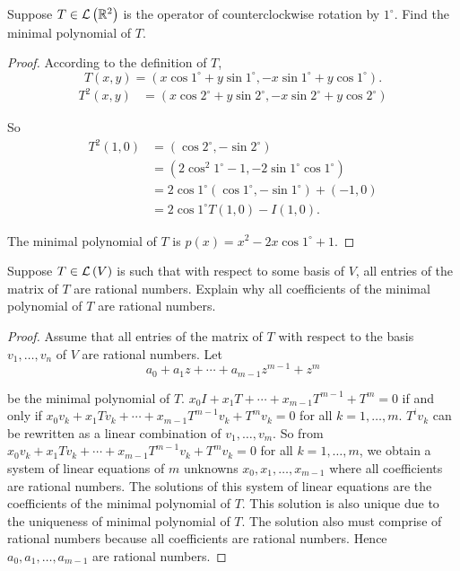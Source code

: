 \begin{exercise}
    Suppose $T\in\mathcal{L}\left({\mathbb{R}^{2}}\right)$ is the operator of counterclockwise rotation by $1^\circ$. Find the minimal polynomial of $T$.
\end{exercise}

\begin{proof}
    According to the definition of $T$,
    \[
        T(x, y) = (x\cos 1^{\circ} + y \sin 1^{\circ}, -x\sin 1^{\circ} + y\cos 1^{\circ}).
    \]
    \begin{align*}
        T^{2}(x, y) & = (x\cos 2^{\circ} + y\sin 2^{\circ}, -x\sin 2^{\circ} + y\cos 2^{\circ})
    \end{align*}

    So
    \begin{align*}
        T^{2}(1, 0) & = (\cos 2^{\circ}, -\sin 2^{\circ})                          \\
                    & = (2\cos^{2} 1^{\circ} - 1, -2\sin 1^{\circ}\cos 1^{\circ})  \\
                    & = 2\cos 1^{\circ}(\cos 1^{\circ}, -\sin 1^{\circ}) + (-1, 0) \\
                    & = 2\cos 1^{\circ} T(1, 0) - I(1, 0).
    \end{align*}

    The minimal polynomial of $T$ is $p(x) = x^{2} - 2x\cos 1^{\circ} + 1$.
\end{proof}
\newpage

\begin{exercise}
    Suppose $T\in\mathcal{L}\left({V}\right)$ is such that with respect to some basis of $V$, all entries of the matrix of $T$ are rational numbers. Explain why all coefficients of the minimal polynomial of $T$ are rational numbers.
\end{exercise}

\begin{proof}
    Assume that all entries of the matrix of $T$ with respect to the basis $v_{1}, \ldots, v_{n}$ of $V$ are rational numbers. Let
    \[
        a_{0} + a_{1}z + \cdots + a_{m-1}z^{m-1} + z^{m}
    \]

    be the minimal polynomial of $T$. $x_{0}I + x_{1}T + \cdots + x_{m-1}T^{m-1} + T^{m} = 0$ if and only if $x_{0}v_{k} + x_{1}Tv_{k} + \cdots + x_{m-1}T^{m-1}v_{k} + T^{m}v_{k} = 0$ for all $k = 1,\ldots, m$. $T^{i}v_{k}$ can be rewritten as a linear combination of $v_{1}, \ldots, v_{m}$. So from  $x_{0}v_{k} + x_{1}Tv_{k} + \cdots + x_{m-1}T^{m-1}v_{k} + T^{m}v_{k} = 0$ for all $k = 1,\ldots, m$, we obtain a system of linear equations of $m$ unknowns $x_{0}, x_{1}, \ldots, x_{m-1}$ where all coefficients are rational numbers. The solutions of this system of linear equations are the coefficients of the minimal polynomial of $T$. This solution is also unique due to the uniqueness of minimal polynomial of $T$. The solution also must comprise of rational numbers because all coefficients are rational numbers. Hence $a_{0}, a_{1}, \ldots, a_{m-1}$ are rational numbers.
\end{proof}
\newpage

